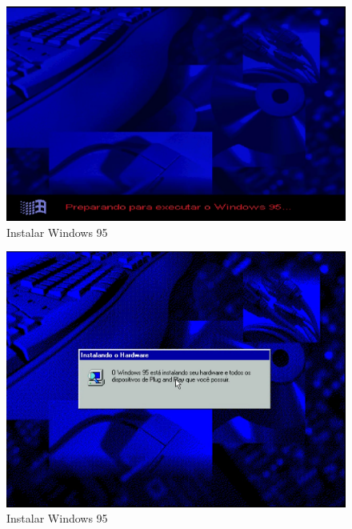 \documentclass{report}
\begin{document}
\begin{figure}
\centering
\includegraphics[width=\textwidth]{Screenshot_44.png}
\caption{Instalar Windows 95}
\label{fig:44}
\end{figure}

\begin{figure}
\centering
\includegraphics[width=\textwidth]{Screenshot_45.png}
\caption{Instalar Windows 95}
\label{fig:45}
\end{figure}
\end{document}

